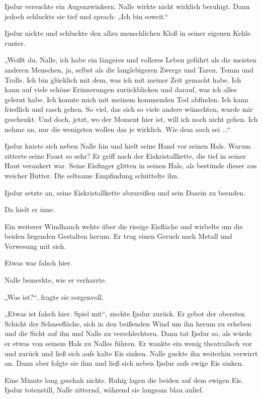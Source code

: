 Ijsdur versuchte ein Augenzwinkern. Nalle wirkte nicht wirklich beruhigt. Dann jedoch schluckte sie tief und sprach: „Ich bin soweit.“

Ijsdur nickte und schluckte den allzu menschlichen Kloß in seiner eigenen Kehle runter.

„Weißt du, Nalle, ich habe ein längeres und volleres Leben geführt als die meisten anderen Menschen, ja, selbst als die langlebigeren Zwerge und Taren, Temm und Trolle. Ich bin glücklich mit dem, was ich mit meiner Zeit gemacht habe. Ich kann auf viele schöne Erinnerungen zurückblicken und darauf, was ich alles gelernt habe. Ich konnte mich mit meinem kommenden Tod abfinden. Ich kann friedlich und rasch gehen. So viel, das sich so viele andere wünschten, wurde mir geschenkt. Und doch, jetzt, wo der Moment hier ist, will ich noch nicht gehen. Ich nehme an, nur die wenigsten wollen das je wirklich. Wie dem auch sei ...“

Ijsdur kniete sich neben Nalle hin und hielt seine Hand vor seinen Hals. Warum zitterte seine Faust so sehr? Er griff nach der Eiskristallkette, die tief in seiner Haut verankert war. Seine Eisfinger glitten in seinen Hals, als bestünde dieser aus weicher Butter. Die seltsame Empfindung schüttelte ihn.

Ijsdur setzte an, seine Eiskristallkette abzureißen und sein Dasein zu beenden.

Da hielt er inne.

Ein weiterer Windhauch wehte über die riesige Eisfläche und wirbelte um die beiden liegenden Gestalten herum. Er trug einen Geruch nach Metall und Verwesung mit sich.

Etwas war falsch hier.

Nalle bemerkte, wie er verharrte.

„Was ist?“, fragte sie sorgenvoll.

„Etwas ist falsch hier. Spiel mit“, zischte Ijsdur zurück. Er gebot der obersten Schicht der Schneefläche, sich in den beißenden Wind um ihn herum zu erheben und die Sicht auf ihn und Nalle zu verschlechtern. Dann tat Ijsdur so, als würde er etwas von seinem Hals zu Nalles führen. Er wankte ein wenig theatralisch vor und zurück und ließ sich aufs kalte Eis sinken. Nalle guckte ihn weiterhin verwirrt an. Dann aber folgte sie ihm und ließ sich neben Ijsdur aufs ewige Eis sinken.

Eine Minute lang geschah nichts. Ruhig lagen die beiden auf dem ewigen Eis. Ijsdur totenstill, Nalle zitternd, während sie langsam blau anlief.

